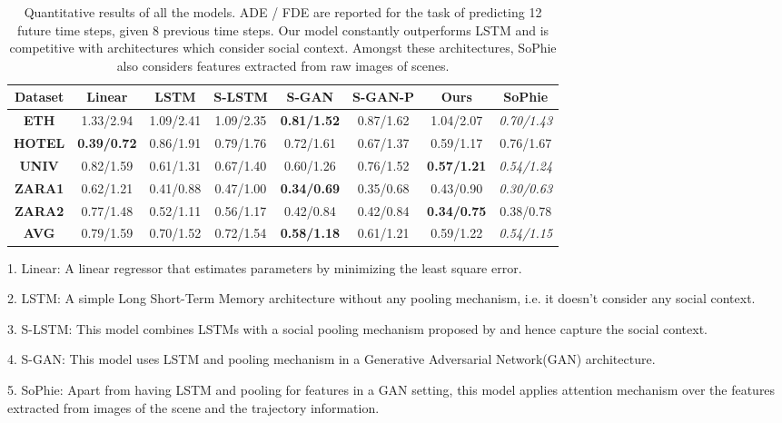 \documentclass[runningheads]{llncs}
\begin{document}
\begin{table}[h!]
\centering


\begin{tabular}{|c| c | c | c | c | c | c || c |} 
 \hline
 \textbf{Dataset} & \textbf{Linear} & \textbf{LSTM} & \textbf{S-LSTM} & \textbf{S-GAN} & \textbf{S-GAN-P} & \textbf{Ours} & \textbf{SoPhie}\\
 \hline\hline
 \textbf{ETH} & 1.33/2.94 & 1.09/2.41 & 1.09/2.35 & \textbf{0.81/1.52} & 0.87/1.62 & 1.04/2.07 & \textit{0.70/1.43}\\  
 \textbf{HOTEL} & \textbf{0.39/0.72} & 0.86/1.91 & 0.79/1.76 & 0.72/1.61 & 0.67/1.37 & 0.59/1.17 & 0.76/1.67\\
 \textbf{UNIV} & 0.82/1.59 & 0.61/1.31 & 0.67/1.40 & 0.60/1.26 & 0.76/1.52 & \textbf{0.57/1.21} & \textit{0.54/1.24}\\
 \textbf{ZARA1} & 0.62/1.21 & 0.41/0.88 & 0.47/1.00 & \textbf{0.34/0.69} & 0.35/0.68 & 0.43/0.90 & \textit{0.30/0.63}\\
 \textbf{ZARA2} & 0.77/1.48 & 0.52/1.11 & 0.56/1.17 & 0.42/0.84 & 0.42/0.84 & \textbf{0.34/0.75} & 0.38/0.78\\
 \hline
 \textbf{AVG} & 0.79/1.59 & 0.70/1.52 & 0.72/1.54 & \textbf{0.58/1.18} & 0.61/1.21 & 0.59/1.22 & \textit{0.54/1.15}\\
 \hline
\end{tabular}
\caption{Quantitative results of all the models. ADE / FDE are reported for the task of predicting 12 future time steps, given 8 previous time steps. Our model constantly outperforms LSTM and is competitive with architectures which consider social context. Amongst these architectures, SoPhie also considers features extracted from raw images of scenes.}
\label{table:1}
\end{table}

1. Linear:  A linear regressor that estimates parameters by minimizing the least square error.

2. LSTM: A simple Long Short-Term Memory architecture without any pooling mechanism, i.e. it doesn't consider any social context.

3. S-LSTM: This model combines LSTMs with a social pooling mechanism proposed by \cite{Alahi_2016_CVPR} and hence capture the social context.

4. S-GAN: This model uses LSTM and pooling mechanism in a Generative Adversarial Network(GAN) architecture.

5. SoPhie: Apart from having LSTM and pooling for features in a GAN setting, this model applies attention mechanism over the features extracted from images of the scene and the trajectory information.
\end{document}
